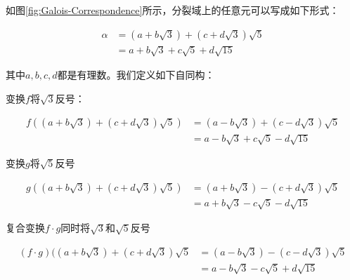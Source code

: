 \documentclass[b5paper]{ctexart}
\begin{document}
如图\ref{fig:Galois-Correspondence}所示，分裂域上的任意元可以写成如下形式：

\[
\begin{array}{rl}
\alpha &= (a + b\sqrt{3}) + (c + d\sqrt{3}) \sqrt {5} \\
       &= a + b\sqrt{3} + c\sqrt{5} + d\sqrt{15}
\end{array}
\]

其中$a, b, c, d$都是有理数。我们定义如下自同构：

变换$f$将$\sqrt{3}$反号：

\[
\begin{array}{rl}
f((a + b\sqrt{3}) + (c + d\sqrt{3}) \sqrt {5}) & = (a - b\sqrt{3}) + (c - d\sqrt{3})\sqrt{5} \\
 & = a - b\sqrt{3} + c\sqrt{5} - d\sqrt{15}
\end{array}
\]

变换$g$将$\sqrt{5}$反号

\[
\begin{array}{rl}
g((a + b\sqrt{3}) + (c + d\sqrt{3}) \sqrt {5}) & = (a + b\sqrt{3}) - (c + d\sqrt{3})\sqrt{5} \\
 & = a + b\sqrt{3} - c\sqrt{5} - d\sqrt{15}
\end{array}
\]

复合变换$f \cdot g$同时将$\sqrt{3}$和$\sqrt{5}$反号

\[
\begin{array}{rl}
(f \cdot g)((a + b\sqrt{3}) + (c + d\sqrt{3}) \sqrt {5} & = (a - b\sqrt{3}) - (c - d\sqrt{3})\sqrt{5} \\
 & = a - b\sqrt{3} - c\sqrt{5} + d\sqrt{15}
\end{array}
\]
\end{document}
